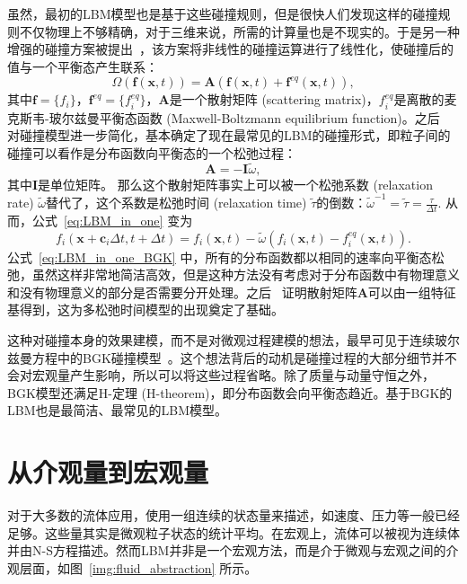 虽然，最初的LBM模型也是基于这些碰撞规则，但是很快人们发现这样的碰撞规则不仅物理上不够精确，对于三维来说，所需的计算量也是不现实的。于是另一种增强的碰撞方案被提出~\citep{higuera1989lattice, higuera1989boltzmann}，该方案将非线性的碰撞运算进行了线性化，使碰撞后的值与一个平衡态产生联系：
\begin{equation}
    \Omega(\mathbf{f}(\mathbf{x},t))=\mathbf{A}(\mathbf{f}(\mathbf{x},t)+\mathbf{f}^{eq}(\mathbf{x},t)),
\end{equation}
其中$\mathbf{f}=\{f_i\}$，$\mathbf{f}^{eq}=\{f_{i}^{eq}\}$，$\mathbf{A}$是一个散射矩阵 (scattering matrix)，$f_{i}^{eq}$是离散的麦克斯韦-玻尔兹曼平衡态函数 (Maxwell-Boltzmann equilibrium function)。之后~\citet{qian1992lattice} 对碰撞模型进一步简化，基本确定了现在最常见的LBM的碰撞形式，即粒子间的碰撞可以看作是分布函数向平衡态的一个松弛过程：
\begin{equation}
    \mathbf{A}=-\mathbf{I}\tilde{\omega},
\end{equation}
其中$\mathbf{I}$是单位矩阵。
那么这个散射矩阵事实上可以被一个松弛系数 (relaxation rate) $\tilde{\omega}$替代了，这个系数是松弛时间 (relaxation time) $\tilde{\tau}$的倒数：$\tilde{\omega}^{-1}=\tilde{\tau}=\frac{\tau}{\Delta t}$. 从而，公式~\ref{eq:LBM_in_one} 变为
\begin{equation}
    f_{i}(\mathbf{x}+\mathbf{c}_i \Delta t,t+\Delta t)=f_{i}(\mathbf{x},t)-\tilde{\omega}(f_{i}(\mathbf{x},t)-f_{i}^{eq}(\mathbf{x},t)).
    \label{eq:LBM_in_one_BGK}
\end{equation}
公式~\ref{eq:LBM_in_one_BGK} 中，所有的分布函数都以相同的速率向平衡态松弛，虽然这样非常地简洁高效，但是这种方法没有考虑对于分布函数中有物理意义和没有物理意义的部分是否需要分开处理。之后~\citet{d1992generalized} 证明散射矩阵$\mathbf{A}$可以由一组特征基得到，这为多松弛时间模型的出现奠定了基础。

这种对碰撞本身的效果建模，而不是对微观过程建模的想法，最早可见于连续玻尔兹曼方程中的BGK碰撞模型~\citep{Bhatnagar-1954}。这个想法背后的动机是碰撞过程的大部分细节并不会对宏观量产生影响，所以可以将这些过程省略。除了质量与动量守恒之外，BGK模型还满足$\mathrm{H}$-定理 (H-theorem)，即分布函数会向平衡态趋近。基于BGK的LBM也是最简洁、最常见的LBM模型。


\section{从介观量到宏观量}
\label{sec:moment}
对于大多数的流体应用，使用一组连续的状态量来描述，如速度、压力等一般已经足够。这些量其实是微观粒子状态的统计平均。在宏观上，流体可以被视为连续体并由N-S方程描述。然而LBM并非是一个宏观方法，而是介于微观与宏观之间的介观层面，如图~\ref{img:fluid_abstraction} 所示。

